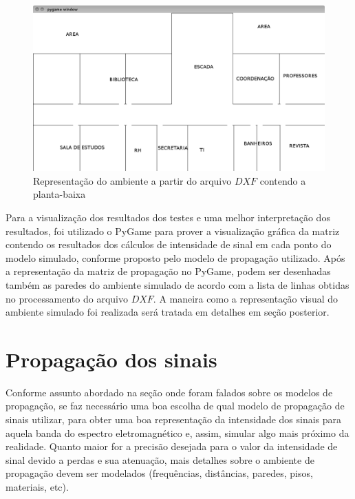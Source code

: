 \documentclass[
	12pt,				%
	twoside,			%
	a4paper,			%
	english,			%
	french,				%
	spanish,			%
	brazil				%
	]{abntex2}
\begin{document}
\begin{figure}[htb]
    \caption{\label{repre_ambiente_dxf_1} Representação do ambiente a partir do arquivo $DXF$ contendo a planta-baixa}
    \begin{center}
        \includegraphics[scale=0.4]{imagens/planta-labels.jpg}
    \end{center}
\end{figure}

Para a visualização dos resultados dos testes e uma melhor interpretação
dos resultados, foi utilizado o PyGame para prover a visualização
gráfica da matriz contendo os resultados dos cálculos de intensidade de
sinal em cada ponto do modelo simulado, conforme proposto pelo modelo de
propagação utilizado. Após a representação da matriz de propagação no
PyGame, podem ser desenhadas também as paredes do ambiente simulado de
acordo com a lista de linhas obtidas no processamento do arquivo
\(DXF\). A maneira como a representação visual do ambiente simulado foi
realizada será tratada em detalhes em seção posterior.

\section{Propagação dos sinais}\label{propagauxe7uxe3o-dos-sinais}

Conforme assunto abordado na seção onde foram falados sobre os modelos
de propagação, se faz necessário uma boa escolha de qual modelo de
propagação de sinais utilizar, para obter uma boa representação da
intensidade dos sinais para aquela banda do espectro eletromagnético e,
assim, simular algo mais próximo da realidade. Quanto maior for a
precisão desejada para o valor da intensidade de sinal devido a perdas e
sua atenuação, mais detalhes sobre o ambiente de propagação devem ser
modelados (frequências, distâncias, paredes, pisos, materiais, etc).
\end{document}
